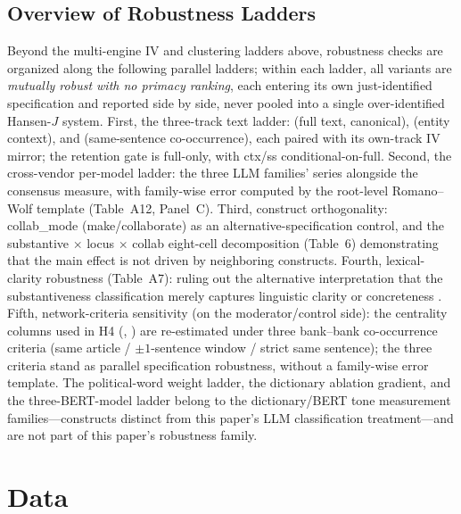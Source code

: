 \subsection{Overview of Robustness Ladders}
Beyond the multi-engine IV and clustering ladders above, robustness checks
are organized along the following parallel ladders; within each ladder, all
variants are \emph{mutually robust with no primacy ranking}, each entering
its own just-identified specification and reported side by side, never
pooled into a single over-identified Hansen-$J$ system. First, the
three-track text ladder:  (full text, canonical),
 (entity context), and 
(same-sentence co-occurrence), each paired with its own-track IV mirror; the
retention gate is full-only, with ctx/ss conditional-on-full. Second, the
cross-vendor per-model ladder: the three LLM families'
 series alongside
the consensus measure, with family-wise error computed by the root-level
Romano--Wolf template (Table~A12, Panel~C). Third, construct orthogonality:
collab\_mode (make/collaborate) as an alternative-specification control, and
the substantive $\times$ locus $\times$ collab eight-cell decomposition
(Table~6) demonstrating that the main effect is not driven by neighboring
constructs. Fourth, lexical-clarity robustness (Table~A7): ruling out the
alternative interpretation that the substantiveness classification merely
captures linguistic clarity or concreteness
\parencite{loughranmcdonald2011liability}. Fifth, network-criteria
sensitivity (on the moderator/control side): the centrality columns used in
H4 (, ) are re-estimated
under three bank--bank co-occurrence criteria (same article / $\pm1$-sentence
window / strict same sentence); the three criteria stand as parallel
specification robustness, without a family-wise error template. The
political-word weight ladder, the dictionary ablation gradient, and the
three-BERT-model ladder belong to the dictionary/BERT tone measurement
families---constructs distinct from this paper's LLM classification
treatment---and are not part of this paper's robustness family.

\section{Data}\label{sec:data}

